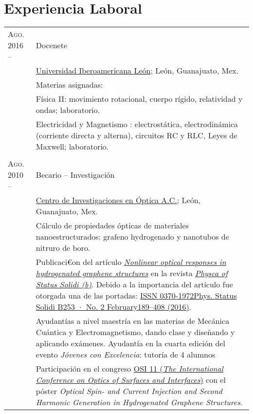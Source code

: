 \documentclass[letterpaper,10pt]{article}
\begin{document}
\section{Experiencia Laboral}
\begin{tabular}{R{4cm}|p{11cm}}
\textsc{Ago. 2016 --  }	&	Docenete \\
						&	\href{http://www.leon.uia.mx}{Universidad Iberoamericana Le\'on}; Le\'on, Guanajuato, Mex.\\
						&	\footnotesize{Materias asignadas: }\\
						&\footnotesize{\qquad F\'isica II: movimiento rotacional, cuerpo r\'igido, relatividad y ondas; laboratorio. }\\
						&\footnotesize{\qquad Electricidad y Magnetismo : electrost\'atica, electrodin\'amica (corriente directa y alterna), circuitos RC y RLC, Leyes de Maxwell; laboratorio. }\\
						 \\
\textsc{Ago. 2010 --}	&	Becario -- Investigaci\'on \\
						&	\href{http://www.cio.mx/}{Centro de Investigaciones en \'Optica A.C.}; Le\'on, Guanajuato, Mex.\\
						&	\footnotesize{C\'alculo de propiedades \'opticas de materiales nanoestructurados: grafeno hydrogenado y nanotubos de nitruro de boro.}\\
						&	\footnotesize{Publicaci€on del art\'iculo \emph{\href{http://onlinelibrary.wiley.com/doi/10.1002/pssb.201670511/abstract}{Nonlinear optical responses in hydrogenated graphene structures}} en la revista \href{http://onlinelibrary.wiley.com/journal/10.1002/(ISSN)1521-3951}{\emph{Physca of Status Solidi (b)}}. Debido a la importancia del art\'iculo fue otorgada una de las portadas: \href{http://onlinelibrary.wiley.com/doi/10.1002/pssb.201670511/epdf}{ISSN 0370-1972Phys. Status Solidi B253 · No. 2 February189–408 (2016)}.} \\
						&	\footnotesize{Ayudant\'ias a nivel maestr\'ia en las materias de Mec\'anica Cu\'antica y Electromagnetismo, dando clase y dise\~nando y aplicando ex\'amenes. Ayudant\'ia en la cuarta edición del evento \emph{J\'ovenes con Excelencia}: tutoría de 4 alumnos}\\
						&	\footnotesize{Participaci\'on en el congreso \href{http://www.osiconference.org/osi2015/index.php}{OSI 11 (\emph{The International Conference on Optics of Surfaces and Interfaces})} con el p\'oster \emph{Optical Spin- and Current Injection and Second Harmonic Generation in Hydrogenated Graphene Structures}.}\\

\end{tabular}
\end{document}
